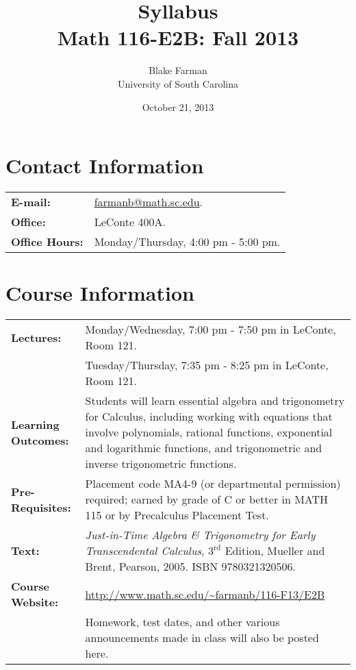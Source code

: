 \documentclass[10pt]{amsart}
\author{Blake Farman\\University of South Carolina}
\title{Syllabus\\Math 116-E2B: Fall 2013}
\date{October 21, 2013}
\begin{document}
\maketitle

\section*{Contact Information}
\noindent
\begin{tabular}{p{1.4in}p{5in}}
  {\bf E-mail:} &\href{mailto:farmanb@math.sc.edu}{farmanb@math.sc.edu}.\\
  {\bf Office:} & LeConte 400A.\\
  {\bf Office Hours:} & Monday/Thursday, 4:00 pm - 5:00 pm.\\
\end{tabular}

\section*{Course Information}
\noindent
\begin{tabular}{p{1.4in}p{5in}}
  {\bf Lectures:} &
  Monday/Wednesday,  7:00 pm - 7:50 pm in LeConte, Room 121.\\
  &Tuesday/Thursday, 7:35 pm - 8:25 pm in LeConte, Room 121.\\
  {\bf Learning Outcomes:} & Students will learn essential algebra and trigonometry for Calculus, including working with equations that 
  involve polynomials, rational functions, exponential and logarithmic functions, and trigonometric and inverse trigonometric functions.\\
  {\bf Pre-Requisites:} & Placement code MA4-9 (or departmental permission) required; earned by grade of C or better in MATH 115 or by Precalculus Placement Test.\\
  {\bf Text:} & {\it Just-in-Time Algebra \& Trigonometry for Early Transcendental Calculus}, $3^\text{rd}$ Edition, Mueller and Brent, Pearson, 2005.  ISBN 9780321320506.\\
  {\bf Course Website:} & \url{http://www.math.sc.edu/~farmanb/116-F13/E2B}\\
  & Homework, test dates, and other various announcements made in class will also be posted here.\\
\end{tabular}
\end{document}
